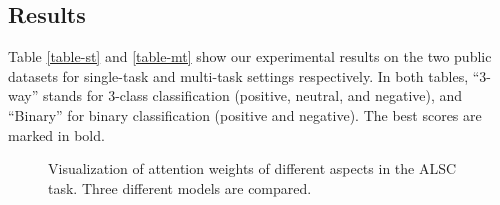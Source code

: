 \documentclass[11pt,a4paper]{article}
\begin{document}
\begin{table}[t!]
\setlength{\abovecaptionskip}{0.0cm}   %
\setlength{\belowcaptionskip}{-0.2cm}   %
\begin{center}
\end{center}
\caption{\label{table-st} Results of the ALSC task in terms of accuracy ($\%$). All methods are run in single-task settings.}	
\end{table}

\subsection{Results}
Table \ref{table-st} and \ref{table-mt} show our experimental results on the two public datasets for single-task and multi-task settings respectively. In both tables, ``3-way'' stands for 3-class classification (positive, neutral, and negative), and ``Binary'' for binary classification (positive and negative). The best scores are marked in bold. 

\begin{figure}
\setlength{\abovecaptionskip}{0.1cm}   %
\setlength{\belowcaptionskip}{-0.2cm}   %
\centering
{}
\vspace{-5pt}
\vspace{-5pt}
\caption{Visualization of attention weights of different aspects in the ALSC task. Three different models are compared.}
\label{compare-att}
\end{figure}
\end{document}
